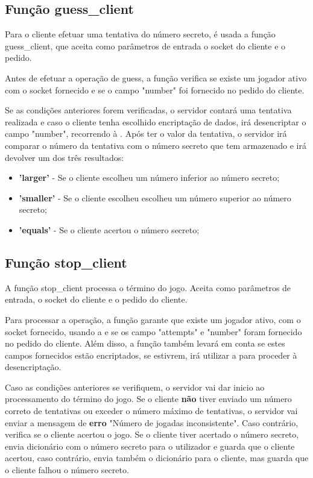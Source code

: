 \documentclass{report}
\begin{document}
\subsection{Função guess\_client}
\label{ssec:func_guess_client}

Para o cliente efetuar uma tentativa do número secreto, é usada a função guess\_client, que aceita como parâmetros de entrada o socket do cliente e o pedido.

Antes de efetuar a operação de guess, a função verifica se existe um jogador ativo com o socket fornecido e se o campo "number" foi fornecido no pedido do cliente.

Se as condições anteriores forem verificadas, o servidor contará uma tentativa realizada e caso o cliente tenha escolhido encriptação de dados, irá desencriptar o campo "number", recorrendo à . Após ter o valor da tentativa, o servidor irá comparar o número da tentativa com o número secreto que tem armazenado e irá devolver um dos três resultados:
\begin{itemize}
\item \textbf{'larger'} - Se o cliente escolheu um número inferior ao número secreto;
\item \textbf{'smaller'} - Se o cliente escolheu escolheu um número superior ao número secreto;
\item \textbf{'equals'} - Se o cliente acertou o número secreto;
\end{itemize}

\subsection{Função stop\_client}
\label{ssec:func_stop_client}

A função stop\_client processa o término do jogo. Aceita como parâmetros de entrada, o socket do cliente e o pedido do cliente.

Para processar a operação, a função garante que existe um jogador ativo, com o socket fornecido, usando a   e se os campo "attempts" e "number" foram fornecido no pedido do cliente. Além disso, a função também levará em conta se estes campos fornecidos estão encriptados, se estivrem, irá utilizar a  para proceder à desencriptação.

Caso as condições anteriores se verifiquem, o servidor vai dar inicio ao processamento do término do jogo. Se o cliente \textbf{não} tiver enviado um número correto de tentativas ou exceder o número máximo de tentativas, o servidor vai enviar a mensagem de \textbf{erro} "Número de jogadas inconsistente". Caso contrário, verifica se o cliente acertou o jogo. Se o cliente tiver acertado o número secreto, envia dicionário com o número secreto para o utilizador e guarda que o cliente acertou, caso contrário, envia também o dicionário para o cliente, mas guarda que o cliente falhou o número secreto.
\end{document}
